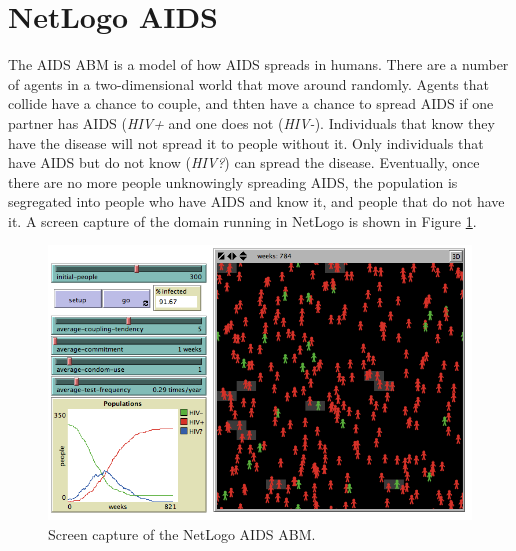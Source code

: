 
\section{NetLogo AIDS}

The AIDS ABM is a model of how AIDS spreads in humans.
There are a number of agents in a two-dimensional world that move around randomly.
Agents that collide have a chance to couple, and thten have a chance to spread AIDS if one partner has AIDS (\textit{HIV+} and one does not (\textit{HIV-}).
Individuals that know they have the disease will not spread it to people without it.
Only individuals that have AIDS but do not know (\textit{HIV?}) can spread the disease.
Eventually, once there are no more people unknowingly spreading AIDS, the population is segregated into people who have AIDS and know it, and people that do not have it.
A screen capture of the domain running in NetLogo is shown in Figure \ref{fig:aidsss}.

\begin{figure}[ht]
\centering
\includegraphics[scale=.5]{images/aids_ss.png}
\caption{Screen capture of the NetLogo AIDS ABM.}
\label{fig:aidsss}
\end{figure}

